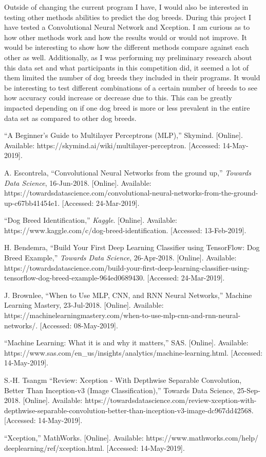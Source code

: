 \documentclass[12pt]{article}
\begin{document}
Outside of changing the current program I have, I would also be interested in testing other methods abilities to predict the dog breeds.  During this project I have tested a Convolutional Neural Network and Xception.  I am curious as to how other methods work and how the results would or would not improve.  It would be interesting to show how the different methods compare against each other as well.  Additionally, as I was performing my preliminary research about this data set and what participants in this competition did, it seemed a lot of them limited the number of dog breeds they included in their programs.  It would be interesting to test different combinations of a certain number of breeds to see how accuracy could increase or decrease due to this.  This can be greatly impacted depending on if one dog breed is more or less prevalent in the entire data set as compared to other dog breeds.

\begin{thebibliography}{9} 

``A Beginner's Guide to Multilayer Perceptrons (MLP),'' Skymind. [Online]. Available: https://skymind.ai/wiki/multilayer-perceptron. [Accessed: 14-May-2019].

A. Escontrela, ``Convolutional Neural Networks from the ground up,'' \textit{Towards Data Science}, 16-Jun-2018. [Online]. Available: https://towardsdatascience.com/convolutional-neural-networks-from-the-ground-up-c67bb41454e1. [Accessed: 24-Mar-2019].

``Dog Breed Identification,'' \textit{Kaggle}. [Online]. Available: https://www.kaggle.com/c/dog-breed-identification. [Accessed: 13-Feb-2019].

H. Bendemra, ``Build Your First Deep Learning Classifier using TensorFlow: Dog Breed Example,'' \textit{Towards Data Science}, 26-Apr-2018. [Online]. Available: https://towardsdatascience.com/build-your-first-deep-learning-classifier-using-tensorflow-dog-breed-example-964ed0689430. [Accessed: 24-Mar-2019].

J. Brownlee, ``When to Use MLP, CNN, and RNN Neural Networks,'' Machine Learning Mastery, 23-Jul-2018. [Online]. Available: https://machinelearningmastery.com/when-to-use-mlp-cnn-and-rnn-neural-networks/. [Accessed: 08-May-2019].

``Machine Learning: What it is and why it matters,'' SAS. [Online]. Available: https://www.sas.com/en\_us/insights/analytics/machine-learning.html. [Accessed: 14-May-2019].

S.-H. Tsangm ``Review: Xception - With Depthwise Separable Convolution, Better Than Inception-v3 (Image Classification),'' Towards Data Science, 25-Sep-2018. [Online]. Available: https://towardsdatascience.com/review-xception-with-depthwise-separable-convolution-better-than-inception-v3-image-dc967dd42568. [Accessed: 14-May-2019].

``Xception,'' MathWorks. [Online]. Available: https://www.mathworks.com/help/\\deeplearning/ref/xception.html. [Accessed: 14-May-2019].

\end{thebibliography}
\end{document}
